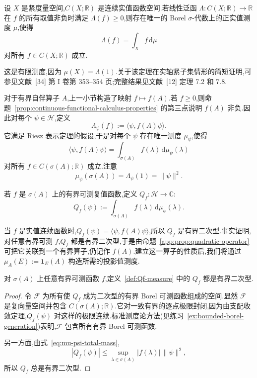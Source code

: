 \begin{theorem}\label{thm:measure-riesz-representation}
设 \(X\) 是紧度量空间,\(C(X;\mathbb{R})\) 是连续实值函数空间.若线性泛函 \(\Lambda:C(X;\mathbb{R})\to\mathbb{R}\) 在 \(f\) 的所有取值非负时满足 \(\Lambda(f)\geq0\),则存在唯一的 Borel \(\sigma\)-代数上的正实值测度 \(\mu\),使得
\[
\Lambda(f)=\int_{X}f\,\mathrm{d}\mu
\]
对所有 \(f\in C(X;\mathbb{R})\) 成立.
\end{theorem}

这是有限测度,因为 \(\mu(X)=\Lambda(1)\).关于该定理在实轴紧子集情形的简短证明,可参见文献~[34] 第 I 卷第 353--354 页;完整结果见文献~[12] 定理 7.2 和 7.8.

对于有界自伴算子 \(A\),上一小节构造了映射 \(f\mapsto f(A)\).若 \(f\geq0\),则命题~\ref{prop:continuous-functional-calculus-properties} 的第三点说明 \(f(A)\) 非负.因此对每个 \(\psi\in\mathcal{H}\),定义
\[
\Lambda_{\psi}(f):=\langle\psi,f(A)\psi\rangle.
\]
它满足 Riesz 表示定理的假设,于是对每个 \(\psi\) 存在唯一测度 \(\mu_{\psi}\),使得
\[
\langle\psi,f(A)\psi\rangle
=\int_{\sigma(A)}f(\lambda)\,\mathrm{d}\mu_{\psi}(\lambda)
\label{eq:measure-riesz-functional-calculus}
\]
对所有 \(f\in C(\sigma(A);\mathbb{R})\) 成立.注意
\[
\mu_{\psi}(\sigma(A))=\Lambda_{\psi}(1)=\|\psi\|^{2}.
\label{eq:mu-psi-total-mass}
\]

\begin{definition}[由测度族定义的二次型]\label{def:Qf-measure}
若 \(f\) 是 \(\sigma(A)\) 上的有界可测复值函数,定义 \(Q_{f}:\mathcal{H}\to\mathbb{C}\):
\[
Q_{f}(\psi):=\int_{\sigma(A)}f(\lambda)\,\mathrm{d}\mu_{\psi}(\lambda).
\label{eq:Qf-definition}
\]
\end{definition}

当 \(f\) 是实值连续函数时,\(Q_{f}(\psi)=\langle\psi,f(A)\psi\rangle\),所以 \(Q_{f}\) 是有界二次型.事实证明,对任意有界可测 \(f\),\(Q_{f}\) 都是有界二次型,于是由命题~\ref{app:prop:quadratic-operator} 可把它关联到一个有界算子,仍记作 \(f(A)\).建立这一算子的性质后,我们将通过 \(\mu_{A}(E):=\mathbf{1}_{E}(A)\) 构造所需的投影值测度.

\begin{proposition}[有界可测函数给出的二次型]\label{prop:Qf-quadratic}
对 \(\sigma(A)\) 上任意有界可测函数 \(f\),定义~\ref{def:Qf-measure} 中的 \(Q_{f}\) 都是有界二次型.
\end{proposition}

\begin{proof}
令 \(\mathcal{F}\) 为所有使 \(Q_{f}\) 成为二次型的有界 Borel 可测函数组成的空间.显然 \(\mathcal{F}\) 是复向量空间并包含 \(C(\sigma(A);\mathbb{R})\).它对一致有界的逐点极限封闭,因为由支配收敛定理,\(Q_{f}(\psi)\) 对这样的极限连续.标准测度论方法(见练习~\ref{ex:bounded-borel-generation})表明,\(\mathcal{F}\) 包含所有有界 Borel 可测函数.

另一方面,由式~\eqref{eq:mu-psi-total-mass},
\[
|Q_{f}(\psi)|\leq\sup_{\lambda\in\sigma(A)}|f(\lambda)|\,\|\psi\|^{2},
\]
所以 \(Q_{f}\) 总是有界二次型.
\end{proof}

